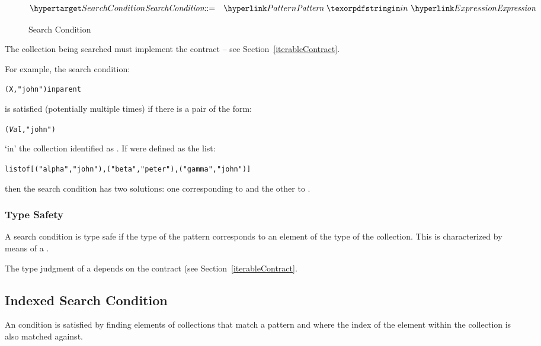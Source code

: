 \begin{figure}[htbp]
\begin{eqnarray*}
\ntDef{SearchCondition}&\arrow&\ntRef{Pattern}\ \q{in}\ \ntRef{Expression}
\end{eqnarray*}
\caption{Search Condition}
\label{searchFormFig}
\end{figure}

\begin{aside}
The collection being searched must implement the  contract -- see Section~\vref{iterableContract}.
\end{aside}

For example, the search condition:
\begin{alltt}
(X,"john") in parent
\end{alltt}
is satisfied (potentially multiple times) if there is a pair of the form:
\begin{alltt}
(\emph{Val},"john")
\end{alltt}
`in' the collection identified as . If  were defined as the list:
\begin{alltt}
list of [ ("alpha","john"), ("beta","peter"), ("gamma","john") ]
\end{alltt}
then the search condition has two solutions: one corresponding to  and the other to .

\subsubsection{Type Safety}
A search condition is type safe if the type of the pattern corresponds to an element of the type of the collection. This is characterized by means of a  .
\begin{prooftree}
\end{prooftree}
The type judgment of a  depends on the  contract (see Section~\vref{iterableContract}.

\subsection{Indexed Search Condition}
\label{indexedSearchCondition}
An  condition is satisfied by finding elements of collections that match a pattern and where the index of the element within the collection is also matched against.

